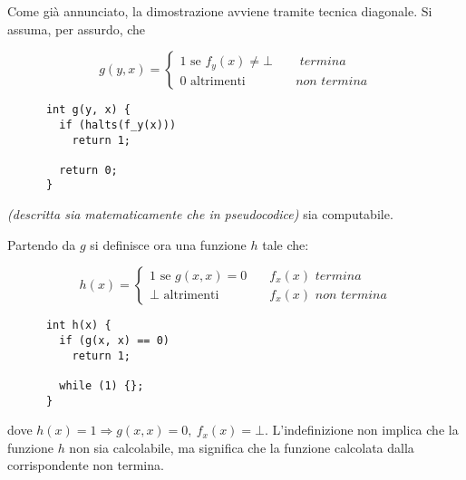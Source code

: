 \documentclass[italian, 10pt]{article}
\begin{document}
Come già annunciato, la dimostrazione avviene tramite tecnica diagonale.
Si assuma, per assurdo, che

\begin{minipage}{0.95\textwidth}
  \bigskip
  \begin{minipage}[]{0.55\textwidth}
    \[ g(y, x) =
      \begin{cases}
        1 \text{ se } f_y(x) \neq \bot & \quad \textit{ termina}    \\
        0 \text{ altrimenti}           & \quad \textit{non termina}
      \end{cases}
    \]
  \end{minipage}
  \begin{minipage}[]{0.35\textwidth}
    \begin{verbatim}
      int g(y, x) {
        if (halts(f_y(x)))
          return 1;

        return 0;
      }
    \end{verbatim}
  \end{minipage}
  \bigskip
\end{minipage}

\textit{(descritta sia matematicamente che in pseudocodice)} sia computabile.

Partendo da \(g\) si definisce ora una funzione \(h\) tale che:

\begin{minipage}{0.95\textwidth}
  \bigskip
  \begin{minipage}[]{0.55\textwidth}
    \[ h(x) =
      \begin{cases}
        1 \text{ se } g(x, x) = 0 & \quad f_x(x) \textit{ termina}      \\
        \bot \text{ altrimenti}   & \quad  f_x(x) \textit{ non termina}
      \end{cases}\]
  \end{minipage}
  \begin{minipage}[]{0.35\textwidth}
    \begin{verbatim}
      int h(x) {
        if (g(x, x) == 0)
          return 1;

        while (1) {};
      }
    \end{verbatim}
  \end{minipage}
  \bigskip
\end{minipage}

dove \(h(x) = 1 \Rightarrow g(x, x) = 0,\ f_x(x) = \bot\).
L'indefinizione non implica che la funzione \(h\) non sia calcolabile, ma significa che la funzione calcolata dalla corrispondente \TM non termina.
\end{document}
